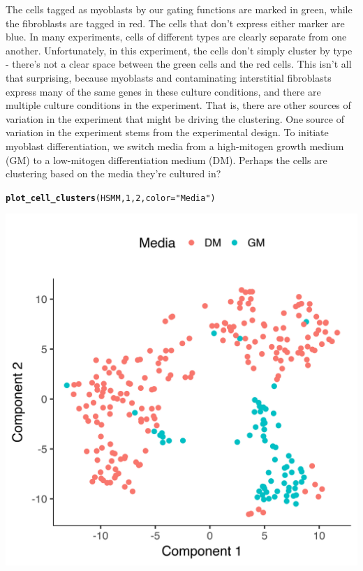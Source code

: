 \documentclass[10pt,oneside]{article}\usepackage[]{graphicx}\usepackage[]{color}
\makeatletter
\def\maxwidth{ %
  \ifdim\Gin@nat@width>\linewidth
    \linewidth
  \else
    \Gin@nat@width
  \fi
}
\newcommand{\hlnum}[1]{\textcolor[rgb]{0.686,0.059,0.569}{#1}}%
\newcommand{\hlstr}[1]{\textcolor[rgb]{0.192,0.494,0.8}{#1}}%
\newcommand{\hlstd}[1]{\textcolor[rgb]{0.345,0.345,0.345}{#1}}%
\newcommand{\hlkwc}[1]{\textcolor[rgb]{0.333,0.667,0.333}{#1}}%
\newcommand{\hlkwd}[1]{\textcolor[rgb]{0.737,0.353,0.396}{\textbf{#1}}}%
\newenvironment{kframe}{%
 \def\at@end@of@kframe{}%
 \ifinner\ifhmode%
  \def\at@end@of@kframe{\end{minipage}}%
  \begin{minipage}{\columnwidth}%
 \fi\fi%
 \def\FrameCommand##1{\hskip\@totalleftmargin \hskip-\fboxsep
 \colorbox{shadecolor}{##1}\hskip-\fboxsep
     \hskip-\linewidth \hskip-\@totalleftmargin \hskip\columnwidth}%
 \MakeFramed {\advance\hsize-\width
   \@totalleftmargin\z@ \linewidth\hsize
   \@setminipage}}%
 {\par\unskip\endMakeFramed%
 \at@end@of@kframe}
\newenvironment{knitrout}{}{} %
\makeatother
\begin{document}
The cells tagged as myoblasts by our gating functions are marked in green, while the fibroblasts are tagged in red. The cells that don't express either marker are blue. In many experiments, cells of different types are clearly separate from one another. Unfortunately, in this experiment, the cells don't simply cluster by type - there's not a clear space between the green cells and the red cells. This isn't all that surprising, because myoblasts and contaminating interstitial fibroblasts express many of the same genes in these culture conditions, and there are multiple culture conditions in the experiment. That is, there are other sources of variation in the experiment that might be driving the clustering. One source of variation in the experiment stems from the experimental design. To initiate myoblast differentiation, we switch media from a high-mitogen growth medium (GM) to a low-mitogen differentiation medium (DM). Perhaps the cells are clustering based on the media they're cultured in?

\begin{knitrout}
\color{fgcolor}\begin{kframe}
\begin{alltt}
\hlkwd{plot_cell_clusters}\hlstd{(HSMM,} \hlnum{1}\hlstd{,} \hlnum{2}\hlstd{,} \hlkwc{color}\hlstd{=}\hlstr{"Media"}\hlstd{)}
\end{alltt}
\end{kframe}

{\centering \includegraphics[width=\maxwidth]{figure/cluster_cells_unsup_plot_by_media-1} 

}



\end{knitrout}
\end{document}
